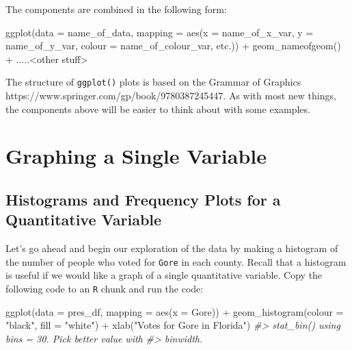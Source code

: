 \documentclass[
]{book}
\newenvironment{Shaded}{\begin{snugshade}}{\end{snugshade}}
\newcommand{\AttributeTok}[1]{\textcolor[rgb]{0.77,0.63,0.00}{#1}}
\newcommand{\CommentTok}[1]{\textcolor[rgb]{0.56,0.35,0.01}{\textit{#1}}}
\newcommand{\FunctionTok}[1]{\textcolor[rgb]{0.00,0.00,0.00}{#1}}
\newcommand{\NormalTok}[1]{#1}
\newcommand{\SpecialCharTok}[1]{\textcolor[rgb]{0.00,0.00,0.00}{#1}}
\newcommand{\StringTok}[1]{\textcolor[rgb]{0.31,0.60,0.02}{#1}}
\begin{document}
The components are combined in the following form:

\begin{Shaded}
\begin{Highlighting}[]
\FunctionTok{ggplot}\NormalTok{(}\AttributeTok{data =}\NormalTok{ name\_of\_data, }\AttributeTok{mapping =} \FunctionTok{aes}\NormalTok{(}\AttributeTok{x =}\NormalTok{ name\_of\_x\_var, }
                                          \AttributeTok{y =}\NormalTok{ name\_of\_y\_var,}
                                          \AttributeTok{colour =}\NormalTok{ name\_of\_colour\_var,}
\NormalTok{                                          etc.)) }\SpecialCharTok{+}
  \FunctionTok{geom\_nameofgeom}\NormalTok{() }\SpecialCharTok{+}
\NormalTok{  .....}\SpecialCharTok{\textless{}}\NormalTok{other stuff}\SpecialCharTok{\textgreater{}}
\end{Highlighting}
\end{Shaded}

The structure of \texttt{ggplot()} plots is based on the Grammar of Graphics https://www.springer.com/gp/book/9780387245447. As with most new things, the components above will be easier to think about with some examples.

\hypertarget{graphing-a-single-variable}{%
\section{Graphing a Single Variable}\label{graphing-a-single-variable}}

\hypertarget{histograms-and-frequency-plots-for-a-quantitative-variable}{%
\subsection{Histograms and Frequency Plots for a Quantitative Variable}\label{histograms-and-frequency-plots-for-a-quantitative-variable}}

Let's go ahead and begin our exploration of the data by making a histogram of the number of people who voted for \texttt{Gore} in each county. Recall that a histogram is useful if we would like a graph of a single quantitative variable. Copy the following code to an \texttt{R} chunk and run the code:

\begin{Shaded}
\begin{Highlighting}[]
\FunctionTok{ggplot}\NormalTok{(}\AttributeTok{data =}\NormalTok{ pres\_df, }\AttributeTok{mapping =} \FunctionTok{aes}\NormalTok{(}\AttributeTok{x =}\NormalTok{ Gore)) }\SpecialCharTok{+}
  \FunctionTok{geom\_histogram}\NormalTok{(}\AttributeTok{colour =} \StringTok{"black"}\NormalTok{, }\AttributeTok{fill =} \StringTok{"white"}\NormalTok{) }\SpecialCharTok{+}
  \FunctionTok{xlab}\NormalTok{(}\StringTok{"Votes for Gore in Florida"}\NormalTok{)}
\CommentTok{\#\textgreater{} \textasciigrave{}stat\_bin()\textasciigrave{} using \textasciigrave{}bins = 30\textasciigrave{}. Pick better value with}
\CommentTok{\#\textgreater{} \textasciigrave{}binwidth\textasciigrave{}.}
\end{Highlighting}
\end{Shaded}
\end{document}
